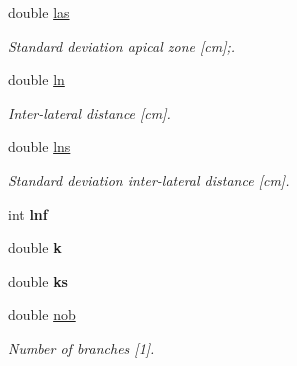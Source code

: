 \begin{DoxyCompactItemize}
double \hyperlink{classCPlantBox_1_1LeafRandomOrganParameter_ade8f4c63b113ec9a8d844a04ea6392dc}{las}
\begin{DoxyCompactList}\small\item\em Standard deviation apical zone \mbox{[}cm\mbox{]};. \end{DoxyCompactList}\item 
\mbox{\label{classCPlantBox_1_1LeafRandomOrganParameter_a4346cb7f372dd335051a90afa3ffe270}} 
double \hyperlink{classCPlantBox_1_1LeafRandomOrganParameter_a4346cb7f372dd335051a90afa3ffe270}{ln}
\begin{DoxyCompactList}\small\item\em Inter-\/lateral distance \mbox{[}cm\mbox{]}. \end{DoxyCompactList}\item 
\mbox{\label{classCPlantBox_1_1LeafRandomOrganParameter_afa3242770ee1fb73f0e5f9311d3e46f8}} 
double \hyperlink{classCPlantBox_1_1LeafRandomOrganParameter_afa3242770ee1fb73f0e5f9311d3e46f8}{lns}
\begin{DoxyCompactList}\small\item\em Standard deviation inter-\/lateral distance \mbox{[}cm\mbox{]}. \end{DoxyCompactList}\item 
\mbox{\label{classCPlantBox_1_1LeafRandomOrganParameter_a7494e87a17171a5bba5e9c3b97cf06ee}} 
int {\bfseries lnf}
\item 
\mbox{\label{classCPlantBox_1_1LeafRandomOrganParameter_a5c622a3f20f65553c2289599393a4679}} 
double {\bfseries k}
\item 
\mbox{\label{classCPlantBox_1_1LeafRandomOrganParameter_a0be2a8cf253553ad105659ff93840767}} 
double {\bfseries ks}
\item 
\mbox{\label{classCPlantBox_1_1LeafRandomOrganParameter_a0b8eb47c7419a1e2f9406b176d2ca4ff}} 
double \hyperlink{classCPlantBox_1_1LeafRandomOrganParameter_a0b8eb47c7419a1e2f9406b176d2ca4ff}{nob}
\begin{DoxyCompactList}\small\item\em Number of branches \mbox{[}1\mbox{]}. \end{DoxyCompactList}\item 

\end{DoxyCompactItemize}
